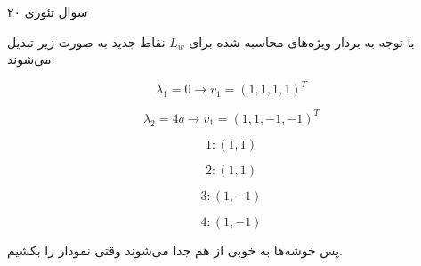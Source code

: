 سوال تئوری ۲۰

با توجه به بردار ویژه‌های محاسبه شده برای 
$L_{w}$
نقاط جدید به صورت زیر تبدیل می‌شوند:

$$
\lambda_{1} = 0 \to v_{1} = (1, 1, 1, 1)^T
$$


$$
\lambda_{2} = 4q \to v_{1} = (1, 1, -1, -1)^T
$$

$$
1: (1, 1)
$$

$$
2: (1, 1)
$$

$$
3: (1, -1)
$$

$$
4: (1, -1)
$$

پس خوشه‌ها به خوبی از هم جدا می‌شوند وقتی نمودار را بکشیم.